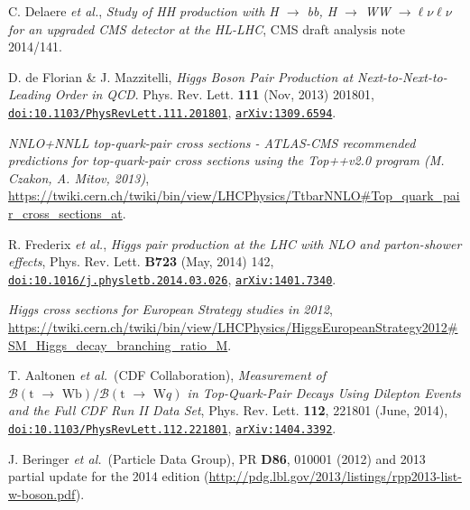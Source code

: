 \documentclass[10pt,a4paper]{article}
\newcommand{\etal}{\emph{et al.}}
\begin{document}
\begin{thebibliography}{1}

 C. Delaere \etal, \emph{Study of HH production with H $\rightarrow$ bb, H $\rightarrow$ WW $\rightarrow \ell\nu\ell\nu$ for an upgraded CMS detector at the HL-LHC}, CMS draft analysis note 2014/141.

 D. de Florian \& J. Mazzitelli, \emph{Higgs Boson Pair Production at Next-to-Next-to-Leading Order in QCD}. Phys. Rev. Lett. \textbf{111} (Nov, 2013) 201801, \href{http://journals.aps.org/prl/abstract/10.1103/PhysRevLett.111.201801}{\texttt{doi:10.1103/PhysRevLett.111.201801}}, \href{http://arxiv.org/abs/1309.6594}{\texttt{arXiv:1309.6594}}.

 \emph{NNLO+NNLL top-quark-pair cross sections - ATLAS-CMS recommended predictions for top-quark-pair cross sections using the Top++v2.0 program (M. Czakon, A. Mitov, 2013)}, \url{https://twiki.cern.ch/twiki/bin/view/LHCPhysics/TtbarNNLO#Top_quark_pair_cross_sections_at}.

 R. Frederix \etal, \emph{Higgs pair production at the LHC with NLO and parton-shower effects}, Phys. Rev. Lett. \textbf{B723} (May, 2014) 142, \href{http://dx.doi.org/10.1016/j.physletb.2014.03.026}{\texttt{doi:10.1016/j.physletb.2014.03.026}}, \href{http://link.aps.org/doi/10.1103/PhysRevLett.112.221801}{\texttt{arXiv:1401.7340}}.

 \emph{Higgs cross sections for European Strategy studies in 2012}, \url{https://twiki.cern.ch/twiki/bin/view/LHCPhysics/HiggsEuropeanStrategy2012#SM_Higgs_decay_branching_ratio_M}.


 T. Aaltonen \etal\ (CDF Collaboration), \emph{Measurement of $\mathcal{B}(\text{t $\rightarrow$ Wb}) / \mathcal{B}(\text{t $\rightarrow$ W$q$})$ in Top-Quark-Pair Decays Using Dilepton Events and the Full CDF Run II Data Set}, Phys. Rev. Lett. \textbf{112}, 221801 (June, 2014), \href{http://journals.aps.org/prl/abstract/10.1103/PhysRevLett.112.221801}{\texttt{doi:10.1103/PhysRevLett.112.221801}}, \href{http://arxiv.org/abs/1404.3392}{\texttt{arXiv:1404.3392}}.

 J. Beringer \etal\ (Particle Data Group), PR \textbf{D86}, 010001 (2012) and 2013 partial update for the 2014 edition (\url{http://pdg.lbl.gov/2013/listings/rpp2013-list-w-boson.pdf}).

%

\end{thebibliography}
\end{document}
